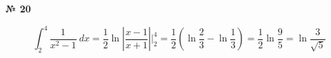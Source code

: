\documentclass{article}
\begin{document}
\textbf{№ 20} 
\large

$$ \int_{2}^{4} \frac{1}{x^2-1} \ dx
= \frac{1}{2} \ln{\left| \frac{x-1}{x+1} \right|}  \bigg\vert_{2}^{4}
= \frac{1}{2} \left( \ln{\frac{2}{3}} - \ln{\frac{1}{3}} \right)
= \frac{1}{2} \ln{\frac{9}{5}}
= \ln{\frac{3}{\sqrt{5}}} $$
\end{document}
